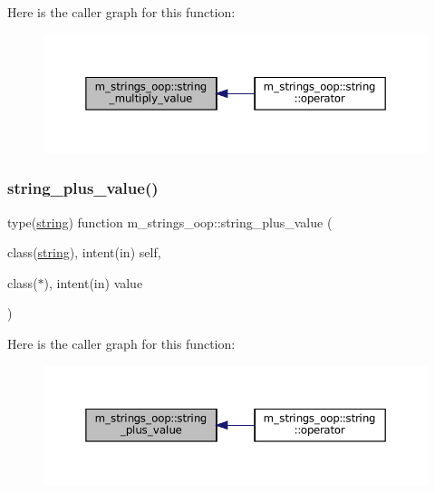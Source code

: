Here is the caller graph for this function\+:\nopagebreak
\begin{figure}[H]
\begin{center}
\leavevmode
\includegraphics[width=350pt]{namespacem__strings__oop_a9624f1e09be383f993e7c0e94b230deb_icgraph}
\end{center}
\end{figure}
\mbox{\label{namespacem__strings__oop_abf27744e539317dac81d6ed1fb736059}} 
\subsubsection{\texorpdfstring{string\+\_\+plus\+\_\+value()}{string\_plus\_value()}}
{\footnotesize\ttfamily type(\mbox{\hyperlink{structm__strings__oop_1_1string}{string}}) function m\+\_\+strings\+\_\+oop\+::string\+\_\+plus\+\_\+value (\begin{DoxyParamCaption}\item[{class(\mbox{\hyperlink{structm__strings__oop_1_1string}{string}}), intent(in)}]{self,  }\item[{class($\ast$), intent(in)}]{value }\end{DoxyParamCaption})\hspace{0.3cm}{\ttfamily [private]}}

Here is the caller graph for this function\+:\nopagebreak
\begin{figure}[H]
\begin{center}
\leavevmode
\includegraphics[width=350pt]{namespacem__strings__oop_abf27744e539317dac81d6ed1fb736059_icgraph}
\end{center}
\end{figure}


